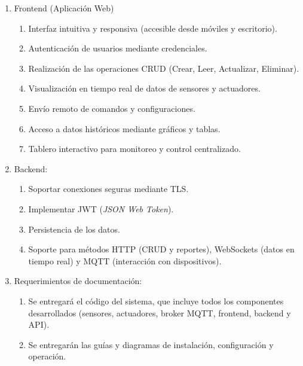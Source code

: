 \begin{enumerate}
      \item Frontend (Aplicación Web)
            \begin{enumerate}
                  \item Interfaz intuitiva y responsiva (accesible desde móviles y escritorio).
                  \item Autenticación de usuarios mediante credenciales.
                  \item Realización de las operaciones CRUD (Crear, Leer, Actualizar, Eliminar).
                  \item Visualización en tiempo real de datos de sensores y actuadores.
                  \item Envío remoto de comandos y configuraciones.
                  \item Acceso a datos históricos mediante gráficos y tablas.
                  \item Tablero interactivo para monitoreo y control centralizado.
            \end{enumerate}

      \item Backend:
            \begin{enumerate}
                  \item Soportar conexiones seguras mediante TLS.
                  \item Implementar JWT (\textit{JSON Web Token}).
                  \item Persistencia de los datos.
                  \item Soporte para métodos HTTP (CRUD y reportes), WebSockets (datos en tiempo real) y MQTT
                        (interacción con dispositivos).
            \end{enumerate}

      \item Requerimientos de documentación:
            \begin{enumerate}
                  \item Se entregará el código del sistema, que incluye todos los componentes
                        desarrollados (sensores, actuadores, broker MQTT, frontend, backend y API).
                  \item Se entregarán las guías y diagramas de instalación, configuración y operación.
            \end{enumerate}
\end{enumerate}

